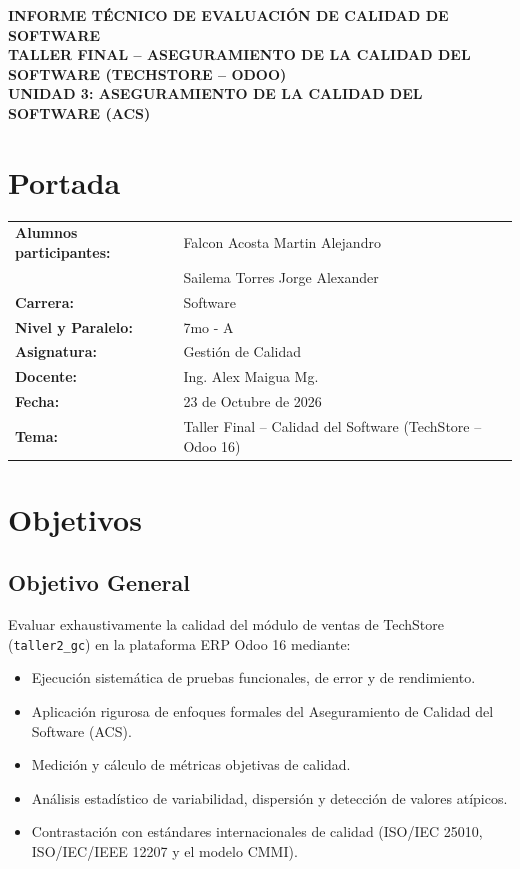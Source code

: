 \documentclass{article}
\begin{document}
\begin{center}
{\Large \textbf{INFORME TÉCNICO DE EVALUACIÓN DE CALIDAD DE SOFTWARE}}\\[0.2cm]
{\large \textbf{TALLER FINAL -- ASEGURAMIENTO DE LA CALIDAD DEL SOFTWARE (TECHSTORE -- ODOO)}}\\[0.1cm]
{\small \textbf{UNIDAD 3: ASEGURAMIENTO DE LA CALIDAD DEL SOFTWARE (ACS)}}
\end{center}

\vspace{0.3cm}

\section{Portada}
\begin{flushleft}
\begin{tabular}{ l l }
\textbf{Alumnos participantes:} & Falcon Acosta Martin Alejandro\\
& Sailema Torres Jorge Alexander\\
\textbf{Carrera:} & Software\\
\textbf{Nivel y Paralelo:} & 7mo - A\\
\textbf{Asignatura:} & Gestión de Calidad\\
\textbf{Docente:} & Ing. Alex Maigua Mg.\\
\textbf{Fecha:} & 23 de Octubre de 2026 \\
\textbf{Tema:} & Taller Final -- Calidad del Software (TechStore -- Odoo 16)
\end{tabular}
\end{flushleft}

\vspace{0.2cm}

\section{Objetivos}
\subsection{Objetivo General}
Evaluar exhaustivamente la calidad del módulo de ventas de TechStore (\texttt{taller2\_gc}) en la plataforma ERP Odoo 16 mediante:
\begin{itemize}[leftmargin=*]
\item Ejecución sistemática de pruebas funcionales, de error y de rendimiento.
\item Aplicación rigurosa de enfoques formales del Aseguramiento de Calidad del Software (ACS).
\item Medición y cálculo de métricas objetivas de calidad.
\item Análisis estadístico de variabilidad, dispersión y detección de valores atípicos.
\item Contrastación con estándares internacionales de calidad (ISO/IEC 25010, ISO/IEC/IEEE 12207 y el modelo CMMI).
\end{itemize}
\end{document}
